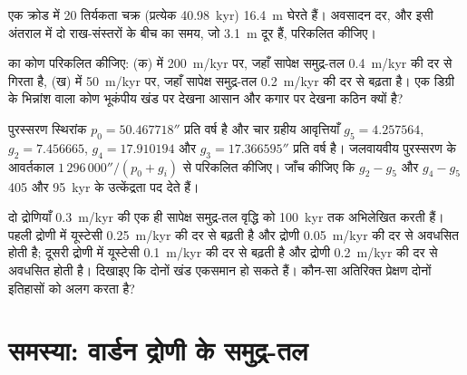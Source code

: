 \begin{exercise}[$\star\star$]\label{exo:b3:sequence-stratigraphy:9}
एक क्रोड में 20 तिर्यकता चक्र (प्रत्येक \qty{40.98}{kyr})
\qty{16.4}{m} घेरते हैं। अवसादन दर, और इसी अंतराल में दो राख-संस्तरों
के बीच का समय, जो \qty{3.1}{m} दूर हैं, परिकलित कीजिए।
\end{exercise}

\begin{exercise}[$\star\star\star$]\label{exo:b3:sequence-stratigraphy:10}
 का कोण परिकलित कीजिए: (क)  में \qty{200}{m/kyr} पर,
जहाँ सापेक्ष समुद्र-तल \qty{0.4}{m/kyr} की दर से गिरता है, (ख)  में
\qty{50}{m/kyr} पर, जहाँ सापेक्ष समुद्र-तल \qty{0.2}{m/kyr} की दर से बढ़ता है।
एक डिग्री के भिन्नांश वाला कोण भूकंपीय खंड पर देखना आसान और
कगार पर देखना कठिन क्यों है?
\end{exercise}

\begin{exercise}[$\star\star\star$]\label{exo:b3:sequence-stratigraphy:11}
पुरस्सरण स्थिरांक $p_0 = 50.467718''$ प्रति वर्ष है और चार ग्रहीय
आवृत्तियाँ $g_5 = 4.257564$, $g_2 = 7.456665$, $g_4 = 17.910194$ और
$g_3 = 17.366595''$ प्रति वर्ष है। जलवायवीय पुरस्सरण के आवर्तकाल
$1\,296\,000''/(p_0 + g_i)$ से परिकलित कीजिए। जाँच कीजिए कि $g_2 - g_5$ और $g_4 - g_5$
405 और \qty{95}{kyr} के उत्केंद्रता पद देते हैं।
\end{exercise}

\begin{exercise}[$\star\star\star$]\label{exo:b3:sequence-stratigraphy:12}
दो द्रोणियाँ \qty{0.3}{m/kyr} की एक ही सापेक्ष समुद्र-तल वृद्धि को
\qty{100}{kyr} तक अभिलेखित करती हैं। पहली द्रोणी में यूस्टेसी \qty{0.25}{m/kyr} की दर से बढ़ती है और द्रोणी
\qty{0.05}{m/kyr} की दर से अवधसित होती है; दूसरी द्रोणी में यूस्टेसी
\qty{0.1}{m/kyr} की दर से बढ़ती है और द्रोणी \qty{0.2}{m/kyr} की दर से अवधसित होती है। दिखाइए कि दोनों
खंड एकसमान हो सकते हैं। कौन-सा अतिरिक्त प्रेक्षण दोनों
इतिहासों को अलग करता है?
\end{exercise}

\section{समस्या: वार्डन द्रोणी के समुद्र-तल}

